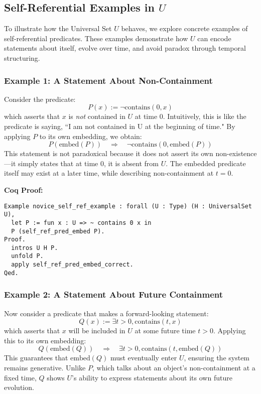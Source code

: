 \documentclass[12pt]{article}
\begin{document}
\subsection{Self-Referential Examples in \( U \)}

To illustrate how the Universal Set \( U \) behaves, we explore concrete examples of self-referential predicates. These examples demonstrate how \( U \) can encode statements about itself, evolve over time, and avoid paradox through temporal structuring.

\subsubsection{Example 1: A Statement About Non-Containment}

Consider the predicate:
\[
P(x) := \neg \text{contains}(0, x)
\]
which asserts that \( x \) is \textit{not} contained in \( U \) at time \( 0 \). Intuitively, this is like the predicate is saying, ``I am not contained in U at the beginning of time." By applying \( P \) to its own embedding, we obtain:
\[
P(\text{embed}(P)) \quad \Rightarrow \quad \neg \text{contains}(0, \text{embed}(P))
\]
This statement is not paradoxical because it does not assert its own non-existence—it simply states that at time \( 0 \), it is absent from \( U \). The embedded predicate itself may exist at a later time, while describing non-containment at \( t=0 \).

\textbf{Coq Proof:}
\begin{lstlisting}[language=Coq]
Example novice_self_ref_example : forall (U : Type) (H : UniversalSet U),
  let P := fun x : U => ~ contains 0 x in
  P (self_ref_pred_embed P).
Proof.
  intros U H P.
  unfold P.
  apply self_ref_pred_embed_correct.
Qed.
\end{lstlisting}

\subsubsection{Example 2: A Statement About Future Containment}

Now consider a predicate that makes a forward-looking statement:
\[
Q(x) := \exists t > 0, \text{contains}(t, x)
\]
which asserts that \( x \) will be included in \( U \) at some future time \( t > 0 \). Applying this to its own embedding:
\[
Q(\text{embed}(Q)) \quad \Rightarrow \quad \exists t > 0, \text{contains}(t, \text{embed}(Q))
\]
This guarantees that \( \text{embed}(Q) \) must eventually enter \( U \), ensuring the system remains generative. Unlike \( P \), which talks about an object's non-containment at a fixed time, \( Q \) shows \( U \)'s ability to express statements about its own future evolution.
\end{document}

